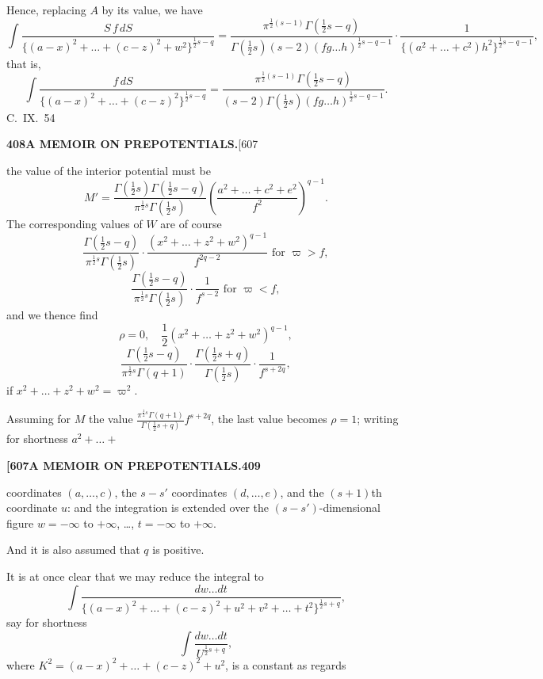 \documentclass[11pt,a4paper]{book}
\begin{document}
{Hence, replacing $A$ by its value, we have
\[
\int \frac{S\,f\,dS}{\{(a-x)^2 + \ldots + (c-z)^2 + w^2\}^{\frac{1}{2}s-q}} = \frac{\pi^{\frac{1}{2}(s-1)}\Gamma(\frac{1}{2}s-q)}{\Gamma(\frac{1}{2}s)(s-2)(fg\ldots h)^{\frac{1}{2}s-q-1}} \cdot \frac{1}{\{(a^2 + \ldots + c^2)h^2\}^{\frac{1}{2}s-q-1}},
\]
that is,
\[
\int \frac{f\,dS}{\{(a-x)^2 + \ldots + (c-z)^2\}^{\frac{1}{2}s-q}} = \frac{\pi^{\frac{1}{2}(s-1)}\Gamma(\frac{1}{2}s-q)}{(s-2)\Gamma(\frac{1}{2}s)(fg\ldots h)^{\frac{1}{2}s-q-1}}.
\]
\hfill C.~IX.\ 54

\newpage
\noindent\textbf{408}\hspace{\fill}\textbf{A MEMOIR ON PREPOTENTIALS.}\hspace{\fill}[607

the value of the interior potential must be
\[
M' = \frac{\Gamma(\frac{1}{2}s)\Gamma(\frac{1}{2}s-q)}{\pi^{\frac{1}{2}s}\Gamma(\frac{1}{2}s)} \left(\frac{a^2 + \ldots + c^2 + e^2}{f^2}\right)^{q-1}.
\]
The corresponding values of $W$ are of course
\[
\frac{\Gamma(\frac{1}{2}s-q)}{\pi^{\frac{1}{2}s}\Gamma(\frac{1}{2}s)} \cdot \frac{(x^2 + \ldots + z^2 + w^2)^{q-1}}{f^{2q-2}} \text{ for } \varpi > f,
\]
\[
\frac{\Gamma(\frac{1}{2}s-q)}{\pi^{\frac{1}{2}s}\Gamma(\frac{1}{2}s)} \cdot \frac{1}{f^{s-2}} \text{ for } \varpi < f,
\]
and we thence find
\[
\rho = 0,\quad \frac{1}{2}(x^2 + \ldots + z^2 + w^2)^{q-1},
\]
\[
\frac{\Gamma(\frac{1}{2}s-q)}{\pi^{\frac{1}{2}s}\Gamma(q+1)} \cdot \frac{\Gamma(\frac{1}{2}s+q)}{\Gamma(\frac{1}{2}s)} \cdot \frac{1}{f^{s+2q}},
\]
if $x^2 + \ldots + z^2 + w^2 = \varpi^2$.

Assuming for $M$ the value $\frac{\pi^{\frac{1}{2}s}\Gamma(q+1)}{\Gamma(\frac{1}{2}s+q)}f^{s+2q}$, the last value becomes $\rho = 1$; writing for shortness $a^2 + \ldots + $

\newpage
\noindent\textbf{[607}\hspace{\fill}\textbf{A MEMOIR ON PREPOTENTIALS.}\hspace{\fill}\textbf{409}

coordinates $(a, \ldots, c)$, the $s-s'$ coordinates $(d, \ldots, e)$, and the $(s+1)$th coordinate $u$: and the integration is extended over the $(s-s')$-dimensional figure $w = -\infty$ to $+\infty$, \ldots, $t = -\infty$ to $+\infty$.

And it is also assumed that $q$ is positive.

It is at once clear that we may reduce the integral to
\[
\int \frac{dw\ldots dt}{\{(a-x)^2 + \ldots + (c-z)^2 + u^2 + v^2 + \ldots + t^2\}^{\frac{1}{2}s+q}},
\]
say for shortness
\[
\int \frac{dw\ldots dt}{U^{\frac{1}{2}s+q}},
\]
where $K^2 = (a-x)^2 + \ldots + (c-z)^2 + u^2$, is a constant as regards

}
\end{document}
